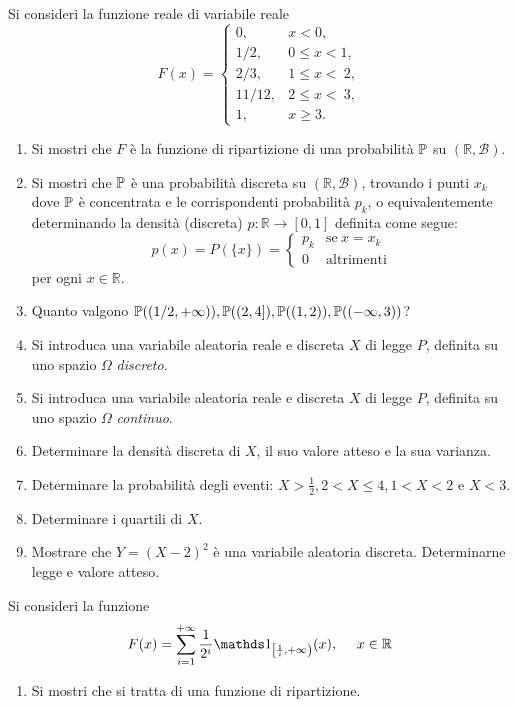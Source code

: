 Si consideri la funzione reale di variabile reale
\begin{equation*}
F(x) =
\begin{cases}
0, & x< 0,\\
1/2, & 0\leq x< 1,\\
2/3, & 1\leq x< \ 2,\\
11/12, & 2\leq x< \ 3,\\
1, & x\geq 3.
\end{cases}
\end{equation*}
\begin{enumerate}
\item Si mostri che $F$ è la funzione di ripartizione di una probabilità $\mathbb{P}$ su $(\mathbb{R} ,\mathcal{B})$.
\item Si mostri che $\mathbb{P}$ è una probabilità discreta su $(\mathbb{R} ,\mathcal{B})$, trovando i punti $x_{k}$ dove $\mathbb{P}$ è concentrata e le corrispondenti probabilità $p_{k}$, o equivalentemente determinando la densità (discreta) $p:\mathbb{R}\rightarrow [0,1]$ definita come segue:
\begin{equation*}
p(x) =P(\{x\}) =
\begin{cases}
p_{k} & \text{se} \ x=x_{k}\\
0 & \text{altrimenti}
\end{cases}
\end{equation*}
per ogni $x\in \mathbb{R}$.
\item Quanto valgono $\mathbb{P}((1/2,+\infty)) ,\mathbb{P}((2,4]) ,\mathbb{P}((1,2)) ,\mathbb{P}((-\infty ,3))$?
\item Si introduca una variabile aleatoria reale e discreta $X$ di legge $P$, definita su uno spazio $\Omega $ \textit{discreto}.
\item Si introduca una variabile aleatoria reale e discreta $X$ di legge $P$, definita su uno spazio $\Omega $ \textit{continuo}.
\item Determinare la densità discreta di $X$, il suo valore atteso e la sua varianza.
\item Determinare la probabilità degli eventi: $X >\frac{1}{2} ,2< X\leq 4,1< X< 2$ e $X< 3$.
\item Determinare i quartili di $X$.
\item Mostrare che $Y=(X-2)^{2}$ è una variabile aleatoria discreta. Determinarne legge e valore atteso.
\end{enumerate}

\Esercizio{}

Si consideri la funzione
\begin{equation*}
F(x) =\sum\limits_{i=1}^{+\infty }\frac{1}{2^{i}}\Ind_{\left[\frac{1}{i} ,+\infty \right)}(x) ,\ \ \ \ x\in \mathbb{R}
\end{equation*}
\begin{enumerate}
\item Si mostri che si tratta di una funzione di ripartizione.
\end{enumerate}

